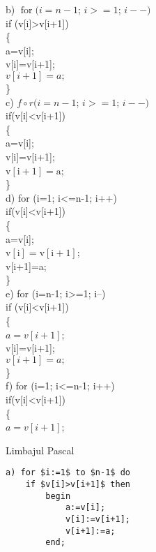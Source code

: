 b) $\operatorname{for}(i=n-1$; $i>=1$; $i--)$\\[0pt]
if (v[i]>v[i+1])\\
\{\\[0pt]
a=v[i];\\[0pt]
v[i]=v[i+1];\\
$v[i+1]=a ;$\\
\}\\
c) $f \circ r(i=n-1$; $i>=1$; $i--)$\\[0pt]
if(v[i]<v[i+1])\\
\{\\[0pt]
a=v[i];\\[0pt]
v[i]=v[i+1];\\
$\mathrm{v}[\mathrm{i}+1]=\mathrm{a}$;\\
\}\\
d) for (i=1; i<=n-1; i++)\\[0pt]
if(v[i]<v[i+1])\\
\{\\[0pt]
a=v[i];\\
$\mathrm{v}[\mathrm{i}]=\mathrm{v}[\mathrm{i}+1]$;\\[0pt]
v[i+1]=a;\\
\}\\
e) for (i=n-1; i>=1; i--)\\[0pt]
if (v[i]<v[i+1])\\
\{\\
$a=v[i+1]$;\\[0pt]
v[i]=v[i+1];\\
$v[i+1]=a ;$\\
\}\\
f) for (i=1; i<=n-1; i++)\\[0pt]
if(v[i]<v[i+1])\\
\{\\
$a=v[i+1]$;

Limbajul Pascal

\begin{verbatim}
a) for $i:=1$ to $n-1$ do
    if $v[i]>v[i+1]$ then
        begin
            a:=v[i];
            v[i]:=v[i+1];
            v[i+1]:=a;
        end;
\end{verbatim}

